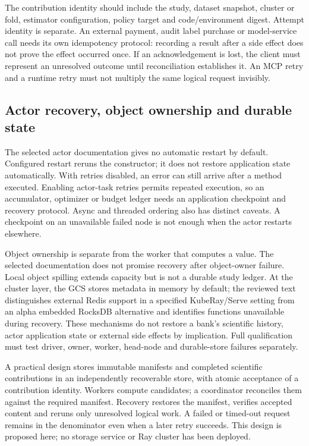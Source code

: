 The contribution identity should include the study, dataset snapshot, cluster or fold, estimator configuration, policy target and code/environment digest. Attempt identity is separate. An external payment, audit label purchase or model-service call needs its own idempotency protocol: recording a result after a side effect does not prove the effect occurred once. If an acknowledgement is lost, the client must represent an unresolved outcome until reconciliation establishes it. An MCP retry and a runtime retry must not multiply the same logical request invisibly.

\subsection{Actor recovery, object ownership and durable state}
The selected actor documentation gives no automatic restart by default. Configured restart reruns the constructor; it does not restore application state automatically. With retries disabled, an error can still arrive after a method executed. Enabling actor-task retries permits repeated execution, so an accumulator, optimizer or budget ledger needs an application checkpoint and recovery protocol. Async and threaded ordering also has distinct caveats. A checkpoint on an unavailable failed node is not enough when the actor restarts elsewhere.~\citep{exec24_ray_sources}

Object ownership is separate from the worker that computes a value. The selected documentation does not promise recovery after object-owner failure. Local object spilling extends capacity but is not a durable study ledger. At the cluster layer, the GCS stores metadata in memory by default; the reviewed text distinguishes external Redis support in a specified KubeRay/Serve setting from an alpha embedded RocksDB alternative and identifies functions unavailable during recovery. These mechanisms do not restore a bank's scientific history, actor application state or external side effects by implication. Full qualification must test driver, owner, worker, head-node and durable-store failures separately.~\citep{exec24_ray_sources}

A practical design stores immutable manifests and completed scientific contributions in an independently recoverable store, with atomic acceptance of a contribution identity. Workers compute candidates; a coordinator reconciles them against the required manifest. Recovery restores the manifest, verifies accepted content and reruns only unresolved logical work. A failed or timed-out request remains in the denominator even when a later retry succeeds. This design is proposed here; no storage service or Ray cluster has been deployed.~\citep{exec24_ray_contract}

